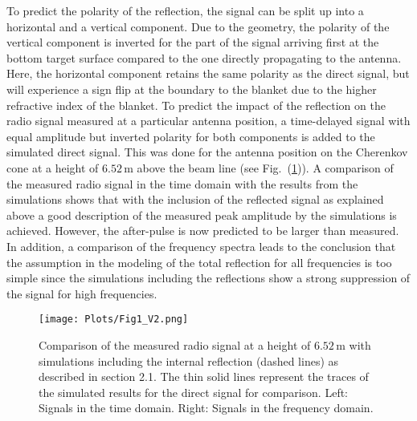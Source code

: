 \documentclass[epj]{webofc}
\newcommand*{\figref}[1]{Fig.~(\ref{fig:#1})}
\newcommand*{\figlab}[1]{\label{fig:#1}}
\begin{document}
To predict the polarity of the reflection, the signal can be split up into a horizontal and a vertical component.
Due to the geometry, the polarity of the vertical component is inverted for the part of the signal arriving first at the bottom target surface compared to the one directly propagating to the antenna. Here, the horizontal component retains the same polarity as the direct signal, but will experience a sign flip at the boundary to the blanket due to the higher refractive index of the blanket. To predict the impact of the reflection on the radio signal measured at a particular antenna position, a time-delayed signal with equal amplitude but inverted polarity for both components is added to the simulated direct signal. 
This was done for the antenna position on the Cherenkov cone at a height of $6.52\,\mbox{m}$ above the beam line (see \figref{withRefl_Cone}). 
A comparison of the measured radio signal in the time domain with the results from the simulations shows that with the inclusion of the reflected signal as explained above a good description of the measured peak amplitude by the simulations is achieved. 
However, the after-pulse is now predicted to be larger than measured.
In addition, a comparison of the frequency spectra leads to the conclusion that the assumption in the modeling of the total reflection for all frequencies is too simple since the simulations including the reflections show a strong suppression of the signal for high frequencies.
%
\begin{figure}
\centering
\texttt{[image: Plots/Fig1\_V2.png]}
\caption{Comparison of the measured radio signal at a height of $6.52\,\mbox{m}$ with simulations including the internal reflection (dashed lines) as described in section 2.1. The thin solid lines represent the traces of the simulated results for the direct signal for comparison. Left: Signals in the time domain. Right: Signals in the frequency domain.}
\figlab{withRefl_Cone}       %
\end{figure}
%
%
\end{document}
